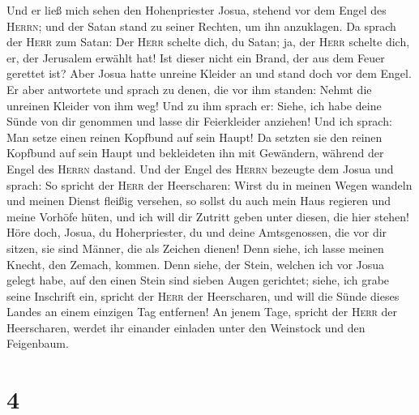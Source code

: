  Und er ließ mich sehen den Hohenpriester Josua, stehend
vor dem Engel des \textsc{Herrn}; und der Satan stand zu seiner Rechten,
um ihn anzuklagen.  Da sprach der \textsc{Herr} zum Satan:
Der \textsc{Herr} schelte dich, du Satan; ja, der \textsc{Herr} schelte
dich, er, der Jerusalem erwählt hat! Ist dieser nicht ein Brand, der aus
dem Feuer gerettet ist?  Aber Josua hatte unreine Kleider
an und stand doch vor dem Engel.  Er aber antwortete und
sprach zu denen, die vor ihm standen: Nehmt die unreinen Kleider von ihm
weg! Und zu ihm sprach er: Siehe, ich habe deine Sünde von dir genommen
und lasse dir Feierkleider anziehen!  Und ich sprach: Man
setze einen reinen Kopfbund auf sein Haupt! Da setzten sie den reinen
Kopfbund auf sein Haupt und bekleideten ihn mit Gewändern, während der
Engel des \textsc{Herrn} dastand.  Und der Engel des
\textsc{Herrn} bezeugte dem Josua und sprach:  So spricht
der \textsc{Herr} der Heerscharen: Wirst du in meinen Wegen wandeln und
meinen Dienst fleißig versehen, so sollst du auch mein Haus regieren und
meine Vorhöfe hüten, und ich will dir Zutritt geben unter diesen, die
hier stehen!  Höre doch, Josua, du Hoherpriester, du und
deine Amtsgenossen, die vor dir sitzen, sie sind Männer, die als Zeichen
dienen! Denn siehe, ich lasse meinen Knecht, den Zemach, kommen.
 Denn siehe, der Stein, welchen ich vor Josua gelegt habe,
auf den einen Stein sind sieben Augen gerichtet; siehe, ich grabe seine
Inschrift ein, spricht der \textsc{Herr} der Heerscharen, und will die
Sünde dieses Landes an einem einzigen Tag entfernen!  An
jenem Tage, spricht der \textsc{Herr} der Heerscharen, werdet ihr
einander einladen unter den Weinstock und den Feigenbaum.

\hypertarget{section-3}{%
\section{4}\label{section-3}}

